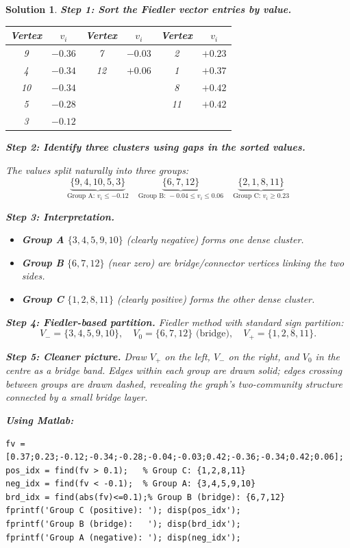 \documentclass[11pt,a4paper]{article}
\theoremstyle{sol}
\newtheorem*{solution}{Solution}
\begin{document}
\begin{solution}
\textbf{Step 1: Sort the Fiedler vector entries by value.}

\begin{center}
\begin{tabular}{cc|cc|cc}
\toprule
Vertex & $v_i$ & Vertex & $v_i$ & Vertex & $v_i$ \\
\midrule
9  & $-0.36$ & 7  & $-0.03$ & 2  & $+0.23$ \\
4  & $-0.34$ & 12 & $+0.06$ & 1  & $+0.37$ \\
10 & $-0.34$ &    &         & 8  & $+0.42$ \\
5  & $-0.28$ &    &         & 11 & $+0.42$ \\
3  & $-0.12$ &    &         &    &         \\
\bottomrule
\end{tabular}
\end{center}

\textbf{Step 2: Identify three clusters using gaps in the sorted values.}

The values split naturally into three groups:
\[
\underbrace{\{9,4,10,5,3\}}_{\text{Group A: }v_i\leq-0.12} \quad
\underbrace{\{6,7,12\}}_{\text{Group B: }-0.04\leq v_i\leq 0.06} \quad
\underbrace{\{2,1,8,11\}}_{\text{Group C: }v_i\geq 0.23}
\]

\textbf{Step 3: Interpretation.}
\begin{itemize}
  \item \textbf{Group A} $\{3,4,5,9,10\}$ (clearly negative) forms one dense cluster.
  \item \textbf{Group B} $\{6,7,12\}$ (near zero) are bridge/connector vertices linking the two sides.
  \item \textbf{Group C} $\{1,2,8,11\}$ (clearly positive) forms the other dense cluster.
\end{itemize}

\textbf{Step 4: Fiedler-based partition.}
Fiedler method with standard sign partition:
\[
V_- = \{3,4,5,9,10\}, \quad V_0=\{6,7,12\}\text{ (bridge)}, \quad V_+ = \{1,2,8,11\}.
\]

\textbf{Step 5: Cleaner picture.} Draw $V_+$ on the left, $V_-$ on the right, and $V_0$ in the centre as a bridge band. Edges within each group are drawn solid; edges crossing between groups are drawn dashed, revealing the graph's two-community structure connected by a small bridge layer.

\textbf{Using Matlab:}
\begin{lstlisting}
fv = [0.37;0.23;-0.12;-0.34;-0.28;-0.04;-0.03;0.42;-0.36;-0.34;0.42;0.06];
pos_idx = find(fv > 0.1);   % Group C: {1,2,8,11}
neg_idx = find(fv < -0.1);  % Group A: {3,4,5,9,10}
brd_idx = find(abs(fv)<=0.1);% Group B (bridge): {6,7,12}
fprintf('Group C (positive): '); disp(pos_idx');
fprintf('Group B (bridge):   '); disp(brd_idx');
fprintf('Group A (negative): '); disp(neg_idx');
\end{lstlisting}
\end{solution}
\end{document}

